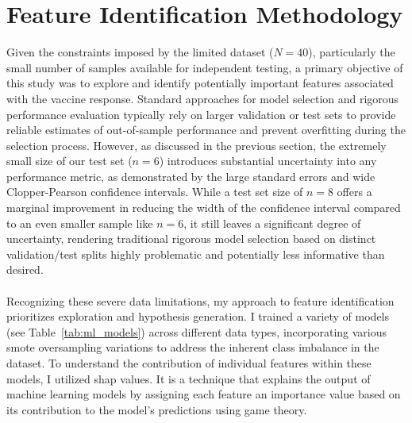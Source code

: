 \documentclass[12pt,a4paper]{report}
\begin{document}
\section{Feature Identification Methodology}
\noindent
Given the constraints imposed by the limited dataset ($N=40$), particularly the small number of samples available for independent testing, a primary objective of this study was to explore and identify potentially important features associated with the vaccine response. Standard approaches for model selection and rigorous performance evaluation typically rely on larger validation or test sets to provide reliable estimates of out-of-sample performance and prevent overfitting during the selection process. However, as discussed in the previous section, the extremely small size of our test set ($n=6$) introduces substantial uncertainty into any performance metric, as demonstrated by the large standard errors and wide Clopper-Pearson confidence intervals. While a test set size of $n=8$ offers a marginal improvement in reducing the width of the confidence interval compared to an even smaller sample like $n=6$, it still leaves a significant degree of uncertainty, rendering traditional rigorous model selection based on distinct validation/test splits highly problematic and potentially less informative than desired.\\
\\
Recognizing these severe data limitations, my approach to feature identification prioritizes exploration and hypothesis generation. I trained a variety of models (see Table~\ref{tab:ml_models}) across different data types, incorporating various \gls{smote} oversampling variations to address the inherent class imbalance in the dataset. To understand the contribution of individual features within these models, I utilized \acrfull{shap} \cite{ApprouchForModelPredictions} values. It is a technique that explains the output of machine learning models by assigning each feature an importance value based on its contribution to the model’s predictions using game theory.
\end{document}
